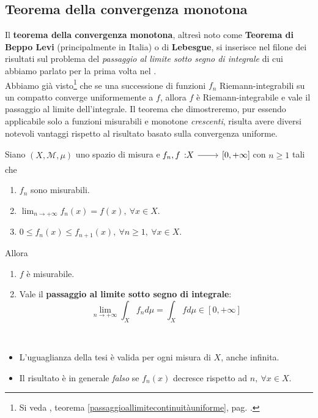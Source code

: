 \subsection{Teorema della convergenza monotona}
Il \textbf{teorema della convergenza monotona}, altresì noto come \textbf{Teorema di Beppo Levi} (principalmente in Italia) o di \textbf{Lebesgue}, si inserisce nel filone dei risultati sul problema del \textit{passaggio al limite sotto segno di integrale} di cui abbiamo parlato per la prima volta nel .\\
Abbiamo già visto\footnote{Si veda , teorema \ref{passaggioallimitecontinuitàuniforme}, pag. \pageref{passaggioallimitecontinuitàuniforme}.} che se una successione di funzioni $f_n$ Riemann-integrabili su un compatto converge uniformemente a $f$, allora $f$ è Riemann-integrabile e vale il passaggio al limite dell'integrale. Il teorema che dimostreremo, pur essendo applicabile solo a funzioni misurabili e monotone \textit{crescenti}, risulta avere diversi notevoli vantaggi rispetto al risultato basato sulla convergenza uniforme.
\begin{theorema}\label{thmconvergenzamonotona}
	Siano $\left(X,\mathcal{M},\mu\right)$ uno spazio di misura e $\funz{f_n,f}{X}{\left[0,+\infty\right]}$ con $n\geq 1$ tali che
	\begin{enumerate}[label=\alph*.]
		\item $f_n$ sono misurabili.
		\item $\displaystyle\lim_{n\to+\infty}f_n(x)=f(x),\ \forall x\in X$.
		\item $0\leq f_n(x)\leq f_{n+1}(x),\ \forall n\geq 1,\ \forall x\in X$.
	\end{enumerate}
Allora
\begin{enumerate}
	\item $f$ è misurabile.
	\item Vale il \textbf{passaggio al limite sotto segno di integrale}:
	\begin{equation}
		\lim_{n\to+\infty}\int_Xf_nd\mu=\int_Xfd\mu\in\left[0,+\infty\right]
	\end{equation}
\end{enumerate}
\end{theorema}
\begin{observes}~{}
	\begin{itemize}
		\item L'uguaglianza della tesi è valida per ogni misura di $X$, anche infinita.
		\item Il risultato è in generale \textit{falso} se $f_n(x)$ decresce rispetto ad $n,\ \forall x\in X$.
	\end{itemize}
\end{observes}
